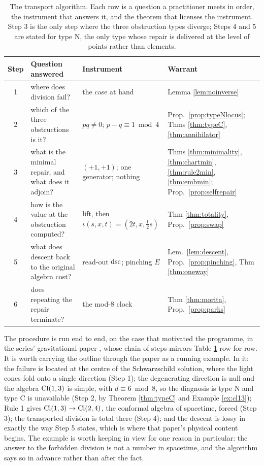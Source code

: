 \begin{table}[ht]
\centering
\footnotesize
\begin{tabular}{c>{\raggedright\arraybackslash}p{3.5cm}>{\raggedright\arraybackslash}p{4.1cm}>{\raggedright\arraybackslash}p{4.3cm}}
\toprule
Step & Question answered & Instrument & Warrant \\
\midrule
1 & where does division fail? & the case at hand & Lemma \ref{lem:noinverse} \\
2 & which of the three obstructions is it? & $pq \neq 0$; $p - q \equiv 1 \bmod 4$ & Prop.\ \ref{prop:typeNlocus}; Thms \ref{thm:typeC}, \ref{thm:annihilator} \\
3 & what is the minimal repair, and what does it adjoin? & $(+1,+1)$; one generator; nothing & Thms \ref{thm:minimality}, \ref{thm:chartmin}, \ref{thm:rule2min}, \ref{thm:embmin}; Prop.\ \ref{prop:selfrepair} \\
4 & how is the value at the obstruction computed? & lift, then $\iota(s,x,t) = (2t,x,\tfrac12 s)$ & Thm \ref{thm:totality}, Prop.\ \ref{prop:swap} \\
5 & what does descent back to the original algebra cost? & read-out $\mathrm{dsc}$; pinching $E$ & Lem.\ \ref{lem:descent}, Prop.\ \ref{prop:pinching}, Thm \ref{thm:oneway} \\
6 & does repeating the repair terminate? & the mod-8 clock & Thm \ref{thm:morita}, Prop.\ \ref{prop:parks} \\
\bottomrule
\end{tabular}
\caption{The transport algorithm. Each row is a question a practitioner meets in order, the instrument that answers it, and the theorem that licenses the instrument. Step 3 is the only step where the three obstruction types diverge; Steps 4 and 5 are stated for type N, the only type whose repair is delivered at the level of points rather than elements.}
\label{tab:algorithm}
\end{table}

\begin{remark}\label{rem:worked}
The procedure is run end to end, on the case that motivated the programme, in the series' gravitational paper \cite{ButlerT5}, whose chain of steps mirrors Table \ref{tab:algorithm} row for row. It is worth carrying the outline through the paper as a running example. In it: the failure is located at the centre of the Schwarzschild solution, where the light cones fold onto a single direction (Step 1); the degenerating direction is null and the algebra $\mathrm{Cl}(1,3)$ is simple, with $d \equiv 6 \bmod 8$, so the diagnosis is type N and type C is unavailable (Step 2, by Theorem \ref{thm:typeC} and Example \ref{ex:cl13}); Rule 1 gives $\mathrm{Cl}(1,3) \to \mathrm{Cl}(2,4)$, the conformal algebra of spacetime, forced (Step 3); the transported division is total there (Step 4); and the descent is lossy in exactly the way Step 5 states, which is where that paper's physical content begins. The example is worth keeping in view for one reason in particular: the answer to the forbidden division is not a number in spacetime, and the algorithm says so in advance rather than after the fact.
\end{remark}

